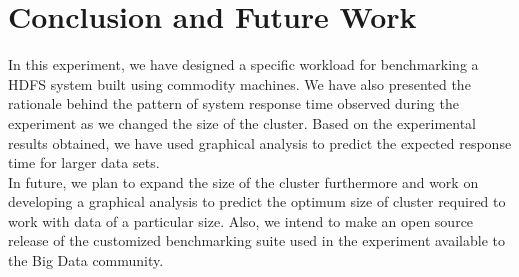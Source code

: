 \documentclass[12pt]{book}
\begin{document}

\chapter{Conclusion and Future Work}
In this experiment, we have designed a specific workload for benchmarking a HDFS system built using commodity machines. 
We have also presented the rationale behind the pattern of system response time observed during the experiment as we changed the size of 
the cluster. Based on the experimental results obtained, we have used graphical analysis to predict the expected response time for larger 
data sets. 
\\\noindent
\newline\noindent
In future, we plan to expand the size of the cluster furthermore and work on developing a graphical analysis to predict the optimum size of 
cluster required to work with data of a particular size. Also, we intend to make an open source release of the customized benchmarking suite 
used in the experiment available to the Big Data community.


\end{document}
